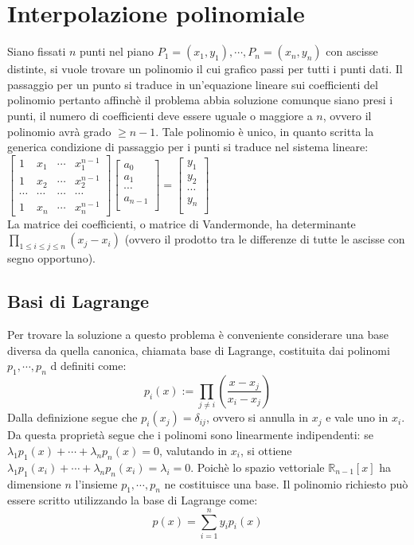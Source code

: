 \section{Interpolazione polinomiale}
Siano fissati $n$ punti nel piano $P_1=(x_1,y_1),\cdots,P_n=(x_n,y_n)$ con ascisse distinte, si vuole trovare un polinomio il cui grafico passi per tutti i punti dati. Il 
passaggio per un punto si traduce in un'equazione lineare sui coefficienti del polinomio pertanto affinch\`e il problema abbia soluzione comunque siano presi i punti, il numero 
di coefficienti deve essere uguale o maggiore a $n$, ovvero il polinomio avr\`a grado $\ge n-1$. Tale polinomio \`e unico, in quanto scritta la generica condizione di passaggio 
per i punti si traduce nel sistema lineare:
$
\left[\begin{matrix}
1 & x_1 & \cdots &x_1^{n-1}\\
1 & x_2 & \cdots &x_2^{n-1} \\
\cdots & \cdots & \cdots & \cdots \\
1 & x_n & \cdots & x_n^{n-1}
\end{matrix}\right]
\left[\begin{matrix}
a_0\\
a_1\\
\cdots\\
a_{n-1}\\
\end{matrix}\right]
=
\left[\begin{matrix}
y_1\\
y_2\\
\cdots\\
y_n\\
\end{matrix}\right]
$\\
La matrice dei coefficienti, o matrice di Vandermonde, ha determinante\\
$\prod\limits_{1\le i\le j\le n}(x_j-x_i)$ (ovvero il prodotto tra le differenze di tutte le ascisse con 
segno opportuno).\\
\subsection{Basi di Lagrange}
Per trovare la soluzione a questo problema \`e conveniente considerare una base diversa da quella canonica, chiamata base di Lagrange, costituita dai polinomi $p_1,\cdots,p_n$ d
definiti come:
\begin{equation}
p_i(x):=\prod\limits_{j\neq i}(\dfrac{x-x_j}{x_i-x_j})
\end{equation}
Dalla definizione segue che $p_i(x_j)=\delta_{ij}$, ovvero si annulla in $x_j$ e vale uno in $x_i$. Da questa propriet\`a segue che i polinomi sono linearmente indipendenti: se
$\lambda_1p_1(x)+\cdots+\lambda_np_n(x)=0$, valutando in $x_i$, si ottiene $\lambda_1p_1(x_i)+\cdots+\lambda_np_n(x_i)=\lambda_i=0$. Poich\`e lo spazio vettoriale 
$\mathbb{R}_{n-1}[x]$ ha dimensione $n$ l'insieme $p_1,\cdots,p_n$ ne costituisce una base. Il polinomio richiesto pu\`o essere scritto utilizzando la base di Lagrange come:
\begin{equation}
p(x)=\sum\limits_{i=1}^ny_ip_i(x)
\end{equation}